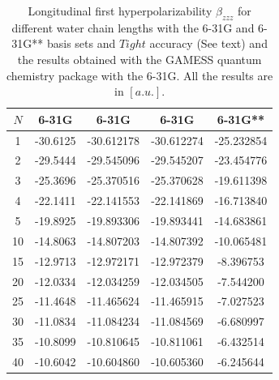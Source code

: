 \documentclass[twocolumn,showpacs,preprintnumbers,amsmath,amssymb]{revtex4}
\begin{document}
\begin{table}
  \centering
  \caption{\protect
    Longitudinal first hyperpolarizability $\beta_{zzz}$
    for different water chain lengths with the 6-31G and 6-31G** basis sets
    and $Tight$ accuracy (See text) and the results obtained with
    the GAMESS quantum chemistry package \cite{gamess} with the 6-31G. 
    All the results are in $[a.u.]$.
  }\label{tab:Beta_1D_Values}
  \begin{ruledtabular}
    \begin{tabular}{ccccc}
      $N$ &\multicolumn{1}{c}{6-31G\footnotemark[1]}
      &\multicolumn{1}{c}{6-31G\footnotemark[2]}
      &\multicolumn{1}{c}{6-31G\footnotemark[2]\footnotemark[3]}
      &\multicolumn{1}{c}{6-31G**\footnotemark[2]}\\
      \hline
      1 & -30.6125 & -30.612178 & -30.612274 & -25.232854 \\
      2 & -29.5444 & -29.545096 & -29.545207 & -23.454776 \\
      3 & -25.3696 & -25.370516 & -25.370628 & -19.611398 \\
      4 & -22.1411 & -22.141553 & -22.141869 & -16.713840 \\
      5 & -19.8925 & -19.893306 & -19.893441 & -14.683861 \\
     10 & -14.8063 & -14.807203 & -14.807392 & -10.065481 \\
     15 & -12.9713 & -12.972171 & -12.972379 &  -8.396753 \\
     20 & -12.0334 & -12.034259 & -12.034505 &  -7.544200 \\
     25 & -11.4648 & -11.465624 & -11.465915 &  -7.027523 \\
     30 & -11.0834 & -11.084234 & -11.084569 &  -6.680997 \\
     35 & -10.8099 & -10.810645 & -10.811061 &  -6.432514 \\
     40 & -10.6042 & -10.604860 & -10.605360 &  -6.245644 \\
    \end{tabular}
  \end{ruledtabular}
\end{table}
\end{document}
